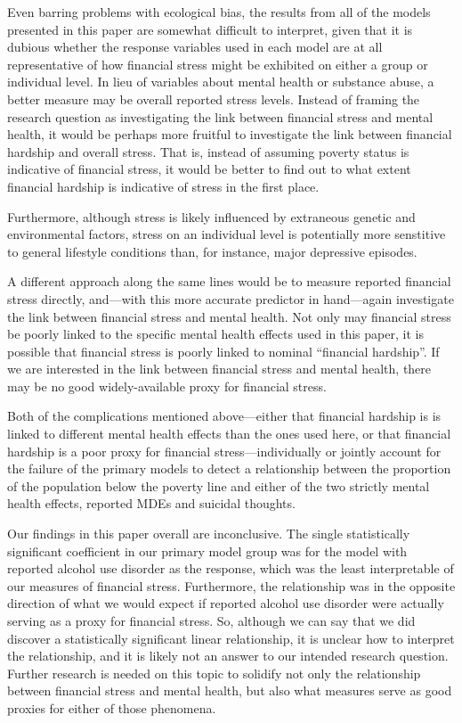 \documentclass{article}
\begin{document}
Even barring problems with ecological bias,
the results from all of the models presented in this paper
are somewhat difficult to interpret,
given that it is dubious whether the response variables
used in each model are at all representative
of how financial stress might be exhibited
on either a group or individual level.
In lieu of variables about mental health or substance abuse,
a better measure may be overall reported stress levels.
Instead of framing the research question as investigating
the link between financial stress and mental health,
it would be perhaps more fruitful to investigate
the link between financial hardship
and overall stress.
That is, instead of assuming poverty status
is indicative of financial stress,
it would be better to find out to what extent
financial hardship is indicative of stress
in the first place.

Furthermore, although stress is likely influenced by
extraneous genetic and environmental factors,
stress on an individual level is potentially more
senstitive to general lifestyle conditions than,
for instance,
major depressive episodes.

A different approach along the same lines would be
to measure reported financial stress directly,
and---with this more accurate predictor in hand---again
investigate the link between financial stress
and mental health.
Not only may financial stress be poorly linked to
the specific mental health effects used in this paper,
it is possible that financial stress is poorly linked
to nominal ``financial hardship''.
If we are interested in the link between financial stress and mental health,
there may be no good widely-available proxy for financial stress.

Both of the complications mentioned above---either
that financial hardship is is linked to different mental
health effects than the ones used here,
or that financial hardship is a poor proxy for financial
stress---individually or jointly account for the
failure of the primary models to detect a relationship
between the proportion of the population below the poverty line
and either of the two strictly mental health effects,
reported MDEs and suicidal thoughts.

Our findings in this paper overall are inconclusive.
The single statistically significant coefficient
in our primary model group was
for the model with reported alcohol use disorder
as the response,
which was the least interpretable of our
measures of financial stress.
Furthermore, the relationship was in the opposite
direction of what we would expect
if reported alcohol use disorder were actually
serving as a proxy for financial stress.
So, although we can say that we did discover
a statistically significant linear relationship,
it is unclear how to interpret the relationship,
and it is likely not an answer to our intended
research question.
Further research is needed on this topic
to solidify not only the relationship between
financial stress and mental health,
but also what measures serve as good proxies
for either of those phenomena.
\end{document}
